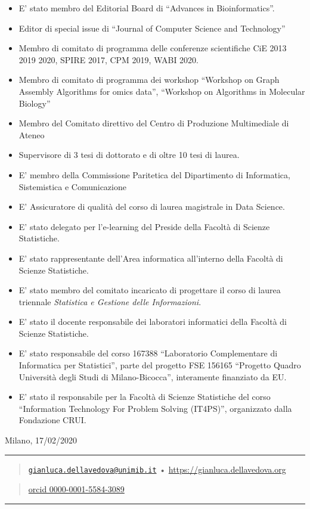 \documentclass[
]{article}
\providecommand{\tightlist}{%
  \setlength{\itemsep}{0pt}\setlength{\parskip}{0pt}}
\begin{document}
\begin{itemize}
\tightlist
\item
  E' stato membro del Editorial Board di ``Advances in Bioinformatics''.
\item
  Editor di special issue di ``Journal of Computer Science and
  Technology''
\item
  Membro di comitato di programma delle conferenze scientifiche CiE 2013
  2019 2020, SPIRE 2017, CPM 2019, WABI 2020.
\item
  Membro di comitato di programma dei workshop ``Workshop on Graph
  Assembly Algorithms for omics data'', ``Workshop on Algorithms in
  Molecular Biology''
\item
  Membro del Comitato direttivo del Centro di Produzione Multimediale di
  Ateneo
\item
  Supervisore di 3 tesi di dottorato e di oltre 10 tesi di laurea.
\item
  E' membro della Commissione Paritetica del Dipartimento di
  Informatica, Sistemistica e Comunicazione
\item
  E' Assicuratore di qualità del corso di laurea magistrale in Data
  Science.
\item
  E' stato delegato per l'e-learning del Preside della Facoltà di
  Scienze Statistiche.
\item
  E' stato rappresentante dell'Area informatica all'interno della
  Facoltà di Scienze Statistiche.
\item
  E' stato membro del comitato incaricato di progettare il corso di
  laurea triennale \emph{Statistica e Gestione delle Informazioni}.
\item
  E' stato il docente responsabile dei laboratori informatici della
  Facoltà di Scienze Statistiche.
\item
  E' stato responsabile del corso 167388 ``Laboratorio Complementare di
  Informatica per Statistici'', parte del progetto FSE 156165 ``Progetto
  Quadro Università degli Studi di Milano-Bicocca'', interamente
  finanziato da EU.
\item
  E' stato il responsabile per la Facoltà di Scienze Statistiche del
  corso ``Information Technology For Problem Solving (IT4PS)'',
  organizzato dalla Fondazione CRUI.
\end{itemize}

Milano, 17/02/2020

\begin{center}\rule{0.5\linewidth}{0.5pt}\end{center}

\begin{quote}
\href{mailto:gianluca.dellavedova@unimib.it}{\nolinkurl{gianluca.dellavedova@unimib.it}}
• \url{https://gianluca.dellavedova.org}
\end{quote}

\begin{quote}
\href{https://orcid.org/0000-0001-5584-3089}{orcid 0000-0001-5584-3089}
\end{quote}

\begin{center}\rule{0.5\linewidth}{0.5pt}\end{center}
\end{document}
